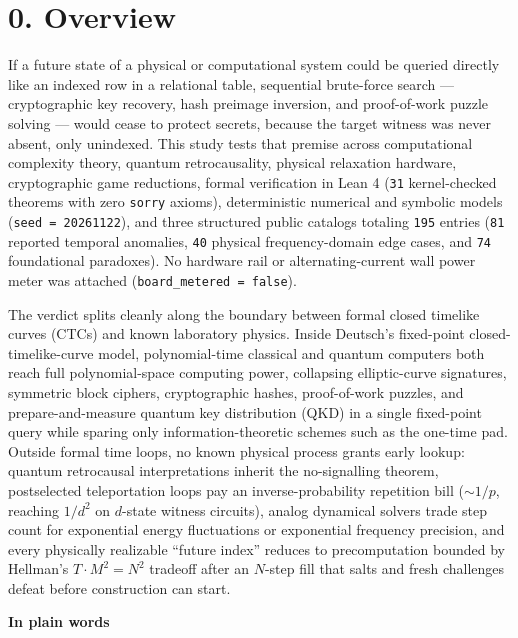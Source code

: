 \documentclass[10pt,letterpaper]{article}
\begin{document}
\section{0. Overview}\label{overview}

If a future state of a physical or computational system could be queried
directly like an indexed row in a relational table, sequential
brute-force search --- cryptographic key recovery, hash preimage
inversion, and proof-of-work puzzle solving --- would cease to protect
secrets, because the target witness was never absent, only unindexed.
This study tests that premise across computational complexity theory,
quantum retrocausality, physical relaxation hardware, cryptographic game
reductions, formal verification in Lean 4 (\texttt{31} kernel-checked
theorems with zero \texttt{sorry} axioms), deterministic numerical and
symbolic models (\texttt{seed\ =\ 20261122}), and three structured
public catalogs totaling \texttt{195} entries (\texttt{81} reported
temporal anomalies, \texttt{40} physical frequency-domain edge cases,
and \texttt{74} foundational paradoxes). No hardware rail or
alternating-current wall power meter was attached
(\texttt{board\_\allowbreak{}metered\ =\ false}).

The verdict splits cleanly along the boundary between formal closed
timelike curves (CTCs) and known laboratory physics. Inside Deutsch's
fixed-point closed-timelike-curve model, polynomial-time classical and
quantum computers both reach full polynomial-space computing power,
collapsing elliptic-curve signatures, symmetric block ciphers,
cryptographic hashes, proof-of-work puzzles, and prepare-and-measure
quantum key distribution (QKD) in a single fixed-point query while
sparing only information-theoretic schemes such as the one-time pad.
Outside formal time loops, no known physical process grants early
lookup: quantum retrocausal interpretations inherit the no-signalling
theorem, postselected teleportation loops pay an inverse-probability
repetition bill (\(\sim 1/p\), reaching \(1/d^2\) on \(d\)-state witness
circuits), analog dynamical solvers trade step count for exponential
energy fluctuations or exponential frequency precision, and every
physically realizable ``future index'' reduces to precomputation bounded
by Hellman's \(T \cdot M^2 = N^2\) tradeoff after an \(N\)-step fill
that salts and fresh challenges defeat before construction can start.

\textbf{In plain words}
\end{document}
